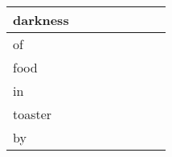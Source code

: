 \documentclass[landscape]{article}
\newcommand{\ssp}{\hspace{2pt}}
\begin{document}
\begin{tabular}{|l|p{10pt}|p{10pt}|p{10pt}|p{10pt}|p{10pt}|p{10pt}|p{10pt}|}
\hline
\ssp darkness \ssp&\hspace{2pt}&\hspace{2pt}&\hspace{2pt}&\hspace{2pt}&\hspace{2pt}&\hspace{2pt}&\hspace{2pt}\\
\hline
\ssp of \ssp&\hspace{2pt}&\hspace{2pt}&\hspace{2pt}&\hspace{2pt}&\hspace{2pt}&\hspace{2pt}&\hspace{2pt}\\
\hline
\ssp food \ssp&\hspace{2pt}&\hspace{2pt}&\hspace{2pt}&\hspace{2pt}&\hspace{2pt}&\hspace{2pt}&\hspace{2pt}\\
\hline
\ssp in \ssp&\hspace{2pt}&\hspace{2pt}&\hspace{2pt}&\hspace{2pt}&\hspace{2pt}&\hspace{2pt}&\hspace{2pt}\\
\hline
\ssp toaster \ssp&\hspace{2pt}&\hspace{2pt}&\hspace{2pt}&\hspace{2pt}&\hspace{2pt}&\hspace{2pt}&\hspace{2pt}\\
\hline
\ssp by \ssp&\hspace{2pt}&\hspace{2pt}&\hspace{2pt}&\hspace{2pt}&\hspace{2pt}&\hspace{2pt}&\hspace{2pt}\\

\end{tabular}
\end{document}
